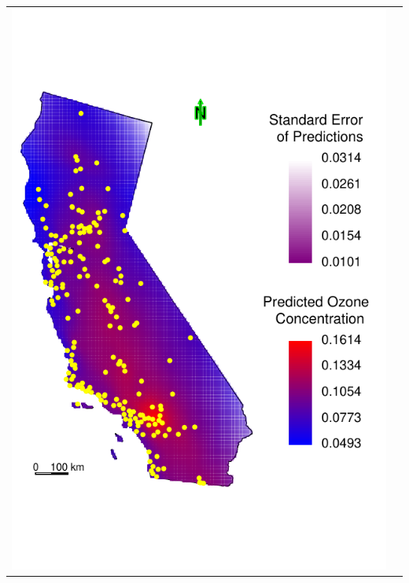 \documentclass[mathserif,compress]{beamer}\usepackage{graphicx, color}
\makeatletter
\def\maxwidth{ %
  \ifdim\Gin@nat@width>\linewidth
    \linewidth
  \else
    \Gin@nat@width
  \fi
}
\newenvironment{knitrout}{}{} %
\makeatother
\begin{document}
\begin{frame} [fragile]
\begin{tabular} {p{3.8cm} p{5.8cm}}
\begin{knitrout}
{\centering \includegraphics[width=\maxwidth]{figure/CA-predMap} 

}



\end{knitrout}

	\end{tabular}

\end{frame}

\end{document}
